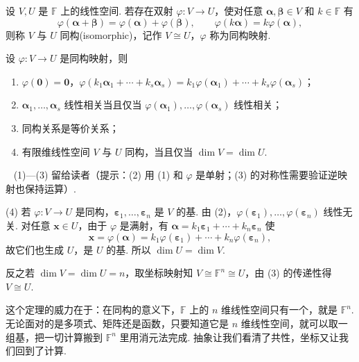 \documentclass[lang=cn,10.5pt,scheme=chinese,toc=twocol,section,chinesefont=nofont,
twoside,citestyle=gb7714-2015,bibstyle=gb7714-2015]{elegantbook}
\DeclareRobustCommand{\textbf}[1]{{\lnsemiboldlatin\lnsemiboldcjk #1}}
\newcommand{\vv}[1]{\boldsymbol{#1}}
\newcommand{\zero}{\boldsymbol{0}}          %
\numberwithin{equation}{section}   %
\newcommand*{\lnlabel}[1]{{\sffamily\bfseries\color{black}#1}}
\renewenvironment{proof}{%
	\par\noindent\lnlabel{\proofname}\;\ \color{black!90}\cfs}{\par}
\begin{document}
\begin{definition}
  设 $V,U$ 是 $\mathbb{F}$ 上的线性空间. 若存在双射 $\varphi:V\to U$，使对任意 $\vv{\alpha},\vv{\beta}\in V$ 和 $k\in\mathbb{F}$ 有
  \[\varphi(\vv{\alpha}+\vv{\beta})=\varphi(\vv{\alpha})+\varphi(\vv{\beta}),\qquad\varphi(k\vv{\alpha})=k\varphi(\vv{\alpha}),\]
  则称 $V$ 与 $U$ \textbf{同构}(isomorphic)，记作 $V\cong U$，$\varphi$ 称为\textbf{同构映射}.
\end{definition}

\begin{theorem}
  \label{thm:isomorphism}
  设 $\varphi: V\to U$ 是同构映射，则
  \begin{enumerate}
    \item $\varphi(\zero)=\zero$，$\varphi(k_1\vv\alpha_1+\cdots+k_s\vv\alpha_s)=k_1\varphi(\vv\alpha_1)+\cdots+k_s\varphi(\vv\alpha_s)$；
    \item $\vv\alpha_1,\ldots,\vv\alpha_s$ 线性相关当且仅当 $\varphi(\vv\alpha_1),\ldots,\varphi(\vv\alpha_s)$ 线性相关；
    \item 同构关系是等价关系；
    \item 有限维线性空间 $V$ 与 $U$ 同构，当且仅当 $\dim V=\dim U$.
  \end{enumerate}
\end{theorem}
\begin{proof}
  (1)—(3) 留给读者（提示：(2) 用 (1) 和 $\varphi$ 是单射；(3) 的对称性需要验证逆映射也保持运算）.

  (4) 若 $\varphi:V\to U$ 是同构，$\vv\varepsilon_1,\ldots,\vv\varepsilon_n$ 是 $V$ 的基. 由 (2)，$\varphi(\vv\varepsilon_1),\ldots,\varphi(\vv\varepsilon_n)$ 线性无关. 对任意 $\vv x\in U$，由于 $\varphi$ 是满射，有 $\vv\alpha=k_1\vv\varepsilon_1+\cdots+k_n\vv\varepsilon_n$ 使
  \[\vv x=\varphi(\vv\alpha)=k_1\varphi(\vv\varepsilon_1)+\cdots+k_n\varphi(\vv\varepsilon_n),\]
  故它们也生成 $U$，是 $U$ 的基. 所以 $\dim U=\dim V$.

  反之若 $\dim V=\dim U=n$，取坐标映射知 $V\cong\mathbb{F}^n\cong U$，由 (3) 的传递性得 $V\cong U$.
\end{proof}

\begin{motivebox}
  这个定理的威力在于：\textbf{在同构的意义下，$\mathbb{F}$ 上的 $n$ 维线性空间只有一个，就是 $\mathbb{F}^n$}. 无论面对的是多项式、矩阵还是函数，只要知道它是 $n$ 维线性空间，就可以取一组基，把一切计算搬到 $\mathbb{F}^n$ 里用消元法完成. 抽象让我们看清了共性，坐标又让我们回到了计算.
\end{motivebox}
\end{document}
